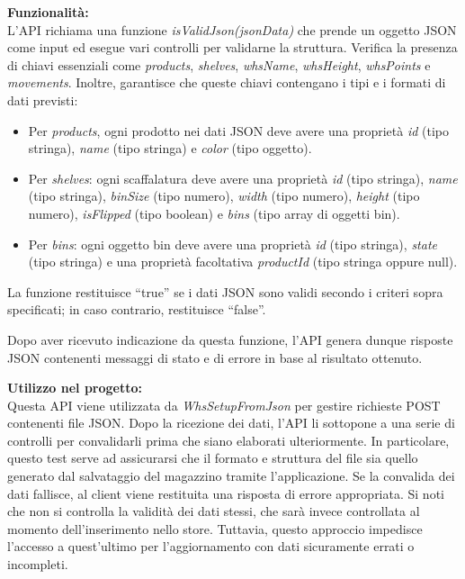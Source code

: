 \bigskip
\noindent \textbf{Funzionalità:}\\
L'API richiama una funzione \textit{isValidJson(jsonData)} che prende un oggetto JSON come input ed esegue vari controlli per validarne la struttura. Verifica la presenza di chiavi essenziali come \textit{products}, \textit{shelves}, \textit{whsName}, \textit{whsHeight}, \textit{whsPoints} e \textit{movements}. Inoltre, garantisce che queste chiavi contengano i tipi e i formati di dati previsti:
\begin{itemize}
    \item Per \textit{products}, ogni prodotto nei dati JSON deve avere una proprietà \textit{id} (tipo stringa), \textit{name} (tipo stringa) e \textit{color} (tipo oggetto).
    \item Per \textit{shelves}: ogni scaffalatura deve avere una proprietà \textit{id} (tipo stringa), \textit{name} (tipo stringa), \textit{binSize} (tipo numero), \textit{width} (tipo numero), \textit{height} (tipo numero), \textit{isFlipped} (tipo boolean) e \textit{bins} (tipo array di oggetti bin).
    \item Per \textit{bins}: ogni oggetto bin deve avere una proprietà \textit{id} (tipo stringa), \textit{state} (tipo stringa) e una proprietà facoltativa \textit{productId} (tipo stringa oppure null).
\end{itemize}
La funzione restituisce ``true'' se i dati JSON sono validi secondo i criteri sopra specificati; in caso contrario, restituisce ``false''.

\noindent Dopo aver ricevuto indicazione da questa funzione, l'API genera dunque risposte JSON contenenti messaggi di stato e di errore in base al risultato ottenuto.

\bigskip
\noindent \textbf{Utilizzo nel progetto:}\\
Questa API viene utilizzata da \textit{WhsSetupFromJson} per gestire richieste POST contenenti file JSON. Dopo la ricezione dei dati, l'API li sottopone a una serie di controlli per convalidarli prima che siano elaborati ulteriormente. In particolare, questo test serve ad assicurarsi che il formato e struttura del file sia quello generato dal salvataggio del magazzino tramite l'applicazione. Se la convalida dei dati fallisce, al client viene restituita una risposta di errore appropriata. Si noti che non si controlla la validità dei dati stessi, che sarà invece controllata al momento dell'inserimento nello store. Tuttavia, questo approccio impedisce l'accesso a quest'ultimo per l'aggiornamento con dati sicuramente errati o incompleti.

